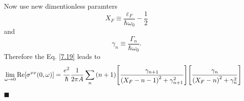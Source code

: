 \noindent
Now use new dimentionless paramters
\begin{equation} \label{6.17}
  X_F \equiv \frac{\varepsilon_F}{\hbar \omega_0} -\frac{1}{2}
\end{equation}
and
\begin{equation} \label{6.17}
  \gamma_n \equiv \frac{\Gamma_n}{\hbar \omega_0}.
\end{equation}
Therefore the Eq. \eqref{7.19} leads to
\begin{equation} \label{7.20}
  \begin{aligned}
    \lim_{\omega \to 0}
    \text{Re}[{\sigma}^{xx}(0,\omega)] & =
    \frac{e^2}{\hbar}
    \frac{1}{2\pi A}
    \sum_{n}
    \qty(n+1)
    \qty[
    \frac{\gamma_{n+1}
    }
    {
    \qty(
    X_F - n - 1
    )^2
    + \gamma^2_{n+1}
    }]
    \qty[
    \frac{\gamma_{n}
    }
    {
    \qty(
    X_F - n
    )^2
    + \gamma^2_{n}
    }]
  \end{aligned}
\end{equation}



















\hfill$\blacksquare$
